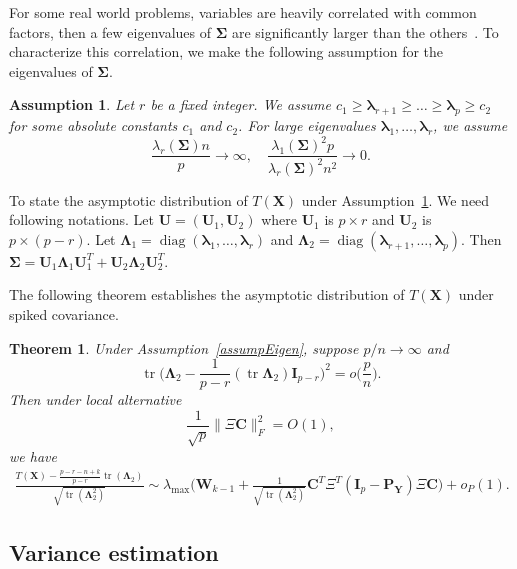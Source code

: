 \documentclass[12pt]{article} %
\DeclareMathOperator{\mytr}{tr}
\DeclareMathOperator{\mydiag}{diag}
\newcommand{\bX}{\mathbf{X}}
\newcommand{\bP}{\mathbf{P}}
\newcommand{\bY}{\mathbf{Y}}
\newcommand{\bC}{\mathbf{C}}
\newcommand{\bI}{\mathbf{I}}
\newcommand{\bU}{\mathbf{U}}
\newcommand{\bW}{\mathbf{W}}
\newcommand{\bfsym}[1]{\ensuremath{\boldsymbol{#1}}}
\def\blambda {\bfsym {\lambda}}
\def\bLambda {\bfsym {\Lambda}}
\def\bSigma {\bfsym {\Sigma}}
\newtheorem{assumption}{Assumption}
\newtheorem{theorem}{Theorem}
\theoremstyle{definition}
\begin{document}
For some real world problems, variables are heavily correlated with common factors, then a few eigenvalues of $\bSigma$ are significantly larger than the others~\cite{Ma2015A}.
To characterize this correlation, we make the following assumption for the eigenvalues of $\bSigma$.

\begin{assumption}\label{assumpEigen}
    Let $r$ be a fixed integer.
    We assume
 $c_1 \geq \blambda_{r+1} \geq \ldots \geq \blambda_{p} \geq c_2$ for some absolute constants $c_1$ and $c_2$.
    For large eigenvalues $\blambda_1,\ldots,\blambda_r$,
    we assume 
    $$\frac{\lambda_r(\bSigma) n}{p}\to \infty,\quad
    \frac{\lambda_1(\bSigma)^2 p}{\lambda_r(\bSigma)^2 n^2}\to 0.$$
\end{assumption}


To state the asymptotic distribution of $T(\bX)$ under Assumption~\ref{assumpEigen}.
We need following notations.
Let $\bU=(\bU_1,\bU_2)$ where $\bU_1$ is $p\times r$ and $\bU_2$ is $p\times (p-r)$.
Let $\bLambda_1=\mydiag(\blambda_1,\ldots,\blambda_r)$ and $\bLambda_2=\mydiag(\blambda_{r+1},\ldots,\blambda_p)$.
Then $\bSigma=\bU_1\bLambda_1 \bU_1^T+\bU_2\bLambda_2 \bU_2^T$.

The following theorem establishes the asymptotic distribution of $T(\bX)$ under spiked covariance.
\begin{theorem}\label{thm1}
    Under Assumption~\eqref{assumpEigen}, suppose $p/n\to \infty$ and
    $$
    \mytr\Big(\bLambda_2-\frac{1}{p-r}(\mytr \bLambda_2)\bI_{p-r}\Big)^2=o\big(\frac{p}{n}\big).
    $$
    Then under local alternative
    \begin{equation*}
        \frac{1}{\sqrt{p}}\|\Xi \bC\|_F^2=O(1),
    \end{equation*}
    we have
    $$
    \begin{aligned}
        \frac{T(\bX)-\frac{p-r-n+k}{p-r}\mytr(\bLambda_2)}{\sqrt{\mytr (\bLambda_2^2)}}
        \sim
        \lambda_{\max}\Big(\bW_{k-1}+\tfrac{1}{\sqrt{\mytr(\bLambda_2^2)}} \bC^T \Xi^T (\bI_p-\bP_{\bY})\Xi \bC\Big)
        +o_P(1).
    \end{aligned}
    $$
\end{theorem}


\subsection{Variance estimation}
\end{document}
